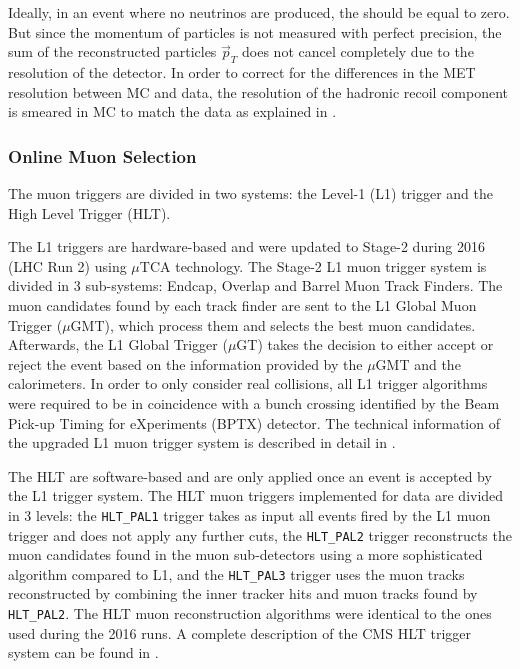 Ideally, in an event where no neutrinos are produced, the \ETslash should be equal to zero. But since the momentum of particles is not measured with perfect precision, the sum of the reconstructed particles $\vec{p}_{T}$ does not cancel completely due to the resolution of the detector. In order to correct for the differences in the MET resolution between MC and data, the resolution of the hadronic recoil component is smeared in MC to match the data as explained in .


\subsubsection{Online Muon Selection} \label{sec:WBoson_Analysis_MuonTrigger}

The muon triggers are divided in two systems: the Level-1 (L1) trigger and the High Level Trigger (HLT). 

The L1 triggers are hardware-based and were updated to Stage-2 during 2016 (LHC Run 2) using $\mu$TCA technology. The Stage-2 L1 muon trigger system is divided in 3 sub-systems: Endcap, Overlap and Barrel Muon Track Finders. The muon candidates found by each track finder are sent to the L1 Global Muon Trigger ($\mu$GMT), which process them and selects the best muon candidates. Afterwards, the L1 Global Trigger ($\mu$GT) takes the decision to either accept or reject the event based on the information provided by the $\mu$GMT and the calorimeters. In order to only consider real collisions, all \pPb L1 trigger algorithms were required to be in coincidence with a bunch crossing identified by the Beam Pick-up Timing for eXperiments (BPTX) detector. The technical information of the upgraded L1 muon trigger system is described in detail in \cite{L1_Muon_Stage2_Paper,L1_Muon_Stage2_Thesis}. 

The HLT are software-based and are only applied once an event is accepted by the L1 trigger system. The HLT muon triggers implemented for \pPb data are divided in 3 levels: the \verb#HLT_PAL1# trigger takes as input all events fired by the L1 muon trigger and does not apply any further cuts, the \verb#HLT_PAL2# trigger reconstructs the muon candidates found in the muon sub-detectors using a more sophisticated algorithm compared to L1, and the \verb#HLT_PAL3# trigger uses the muon tracks reconstructed by combining the inner tracker hits and muon tracks found by \verb#HLT_PAL2#. The HLT muon reconstruction algorithms were identical to the ones used during the 2016 \pp runs. A complete description of the CMS HLT trigger system can be found in \cite{CMS_Trigger}.

